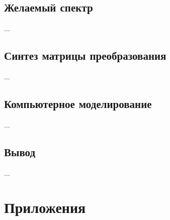 \documentclass[a4paper, 12pt]{article}
\begin{document}
    \subsection{Желаемый спектр}
    ...


    \subsection{Синтез матрицы преобразования}
    ...


    \subsection{Компьютерное моделирование}
    ...


    \subsection{Вывод}
    ...


    \section{Приложения}
\end{document}
